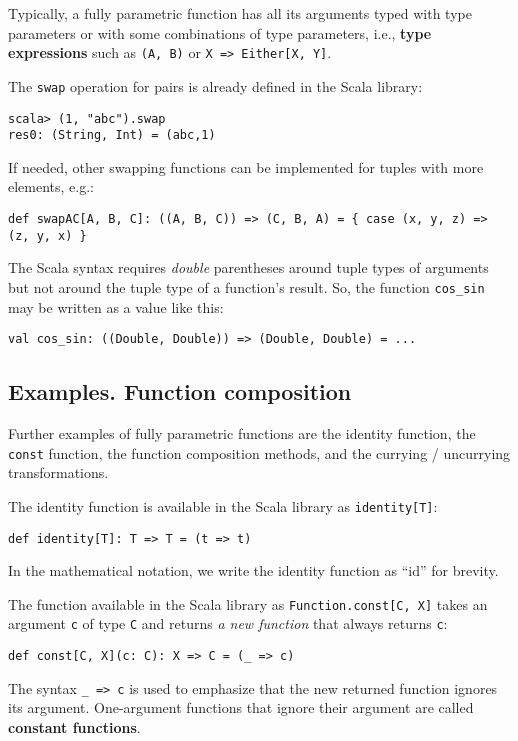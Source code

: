 Typically, a fully parametric function has all its arguments typed
with type parameters or with some combinations of type parameters,
i.e., \textbf{type expressions} such as \lstinline!(A, B)!
or \lstinline!X => Either[X, Y]!.

The \lstinline!swap! operation for pairs is already defined in the
Scala library:
\begin{lstlisting}
scala> (1, "abc").swap
res0: (String, Int) = (abc,1)
\end{lstlisting}
If needed, other swapping functions can be implemented for tuples
with more elements, e.g.:
\begin{lstlisting}
def swapAC[A, B, C]: ((A, B, C)) => (C, B, A) = { case (x, y, z) => (z, y, x) }
\end{lstlisting}
The Scala syntax requires \emph{double} parentheses around tuple types
of arguments but not around the tuple type of a function\textsf{'}s result.
So, the function \lstinline!cos_sin! may be written as a value like
this:
\begin{lstlisting}
val cos_sin: ((Double, Double)) => (Double, Double) = ...
\end{lstlisting}


\subsection{Examples. Function composition\label{subsec:Examples-of-fully-parametric}}

Further examples of fully parametric functions are the identity function,
the \lstinline!const! function, the function composition methods,
and the currying / uncurrying transformations. 

The identity function is available in the
Scala library as \lstinline!identity[T]!:
\begin{lstlisting}
def identity[T]: T => T = (t => t)
\end{lstlisting}
In the mathematical notation, we write the identity function as \textsf{``}$\text{id}$\textsf{''}
for brevity.

The function available in the Scala library as \lstinline!Function.const[C, X]!
takes an argument \lstinline!c! of type \lstinline!C! and returns
\emph{a new function} that always returns \lstinline!c!:
\begin{lstlisting}
def const[C, X](c: C): X => C = (_ => c)
\end{lstlisting}
The syntax \lstinline!_ => c! is used to emphasize that the new returned
function ignores its argument. One-argument functions that ignore
their argument are called \textbf{constant functions}.

